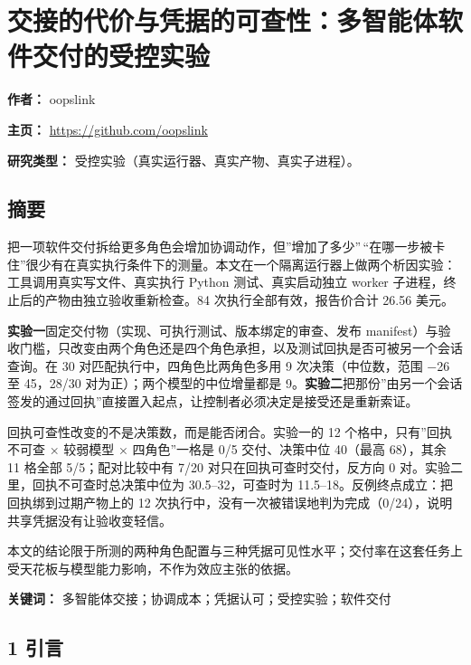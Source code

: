 \documentclass[
]{article}
\author{}
\date{}
\begin{document}
\section{交接的代价与凭据的可查性：多智能体软件交付的受控实验}\label{ux4ea4ux63a5ux7684ux4ee3ux4ef7ux4e0eux51edux636eux7684ux53efux67e5ux6027ux591aux667aux80fdux4f53ux8f6fux4ef6ux4ea4ux4ed8ux7684ux53d7ux63a7ux5b9eux9a8c}

\textbf{作者：} oopslink

\textbf{主页：} \url{https://github.com/oopslink}

\textbf{研究类型：} 受控实验（真实运行器、真实产物、真实子进程）。

\subsection{摘要}\label{ux6458ux8981}

把一项软件交付拆给更多角色会增加协调动作，但''增加了多少''\,``在哪一步被卡住''很少有在真实执行条件下的测量。本文在一个隔离运行器上做两个析因实验：工具调用真实写文件、真实执行
Python 测试、真实启动独立 worker
子进程，终止后的产物由独立验收重新检查。84 次执行全部有效，报告价合计
26.56 美元。

\textbf{实验一}固定交付物（实现、可执行测试、版本绑定的审查、发布
manifest）与验收门槛，只改变由两个角色还是四个角色承担，以及测试回执是否可被另一个会话查询。在
30 对匹配执行中，四角色比两角色多用 9 次决策（中位数，范围 −26 至
45，28/30 对为正）；两个模型的中位增量都是
9。\textbf{实验二}把那份''由另一个会话签发的通过回执''直接置入起点，让控制者必须决定是接受还是重新索证。

回执可查性改变的不是决策数，而是能否闭合。实验一的 12
个格中，只有''回执不可查 × 较弱模型 × 四角色''一格是 0/5 交付、决策中位
40（最高 68），其余 11 格全部 5/5；配对比较中有 7/20
对只在回执可查时交付，反方向 0 对。实验二里，回执不可查时总决策中位为
30.5--32，可查时为 11.5--18。反例终点成立：把回执绑到过期产物上的 12
次执行中，没有一次被错误地判为完成（0/24），说明共享凭据没有让验收变轻信。

本文的结论限于所测的两种角色配置与三种凭据可见性水平；交付率在这套任务上受天花板与模型能力影响，不作为效应主张的依据。

\textbf{关键词：} 多智能体交接；协调成本；凭据认可；受控实验；软件交付

\subsection{1 引言}\label{ux5f15ux8a00}
\end{document}
